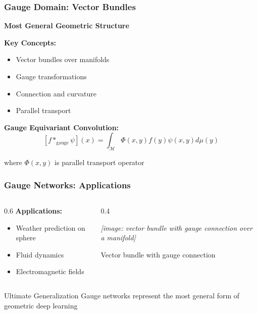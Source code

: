 \begin{frame}[fragile]\frametitle{Gauge Domain: Vector Bundles}

\begin{center}
\textbf{Most General Geometric Structure}
\end{center}


\textbf{Key Concepts:}
\begin{itemize}
\item Vector bundles over manifolds
\item Gauge transformations
\item Connection and curvature
\item Parallel transport
\end{itemize}

\textbf{Gauge Equivariant Convolution:}
$$[f *_{\text{gauge}} \psi](x) = \int_{\mathcal{M}} \Phi(x,y) f(y) \psi(x,y) d\mu(y)$$

where $\Phi(x,y)$ is parallel transport operator

\end{frame}


\begin{frame}[fragile]\frametitle{Gauge Networks: Applications}

\begin{columns}
\begin{column}{0.6\textwidth}
\textbf{Applications:}
\begin{itemize}
\item Weather prediction on sphere
\item Fluid dynamics
\item Electromagnetic fields
\end{itemize}
\end{column}
\begin{column}{0.4\textwidth}
\begin{center}
\textit{[image: vector bundle with gauge connection over a manifold]}

{\small Vector bundle with gauge connection}
\end{center}
\end{column}
\end{columns}

\begin{alertblock}{Ultimate Generalization}
Gauge networks represent the most general form of geometric deep learning
\end{alertblock}

\end{frame}

